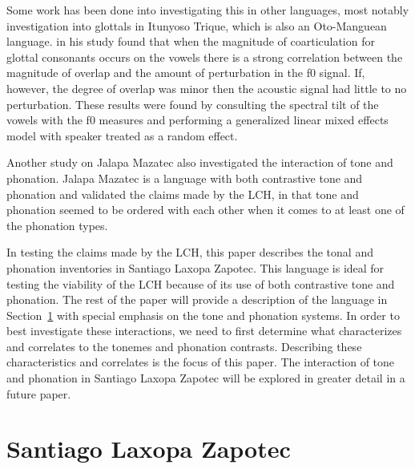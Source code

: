 \documentclass[12pt, letterpaper]{article}
\begin{document}
Some work has been done into investigating this in other languages, most notably  investigation into glottals in Itunyoso Trique, which is also an Oto-Manguean language. \citeauthor{dicanioCoarticulationToneGlottal2012} in his study found that when the magnitude of coarticulation for glottal consonants occurs on the vowels there is a strong correlation between the magnitude of overlap and the amount of perturbation in the f0 signal. If, however, the degree of overlap was minor then the acoustic signal had little to no perturbation. These results were found by consulting the spectral tilt of the vowels with the f0 measures and performing a generalized linear mixed effects model with speaker treated as a random effect. 

Another study on Jalapa Mazatec \citep{garellekAcousticConsequencesPhonation2011} also investigated the interaction of tone and phonation. Jalapa Mazatec is a language with both contrastive tone and phonation and \citet{garellekAcousticConsequencesPhonation2011} validated the claims made by the LCH, in that tone and phonation seemed to be ordered with each other when it comes to at least one of the phonation types.

In testing the claims made by the LCH, this paper describes the tonal and phonation inventories in Santiago Laxopa Zapotec. This language is ideal for testing the viability of the LCH because of its use of both contrastive tone and phonation. The rest of the paper will provide a description of the language in Section~\ref{sec:SLZ} with special emphasis on the tone and phonation systems. In order to best investigate these interactions, we need to first determine what characterizes and correlates to the tonemes and phonation contrasts. Describing these characteristics and correlates is the focus of this paper. The interaction of tone and phonation in Santiago Laxopa Zapotec will be explored in greater detail in a future paper.  
 
\section{Santiago Laxopa Zapotec} \label{sec:SLZ}
\end{document}
